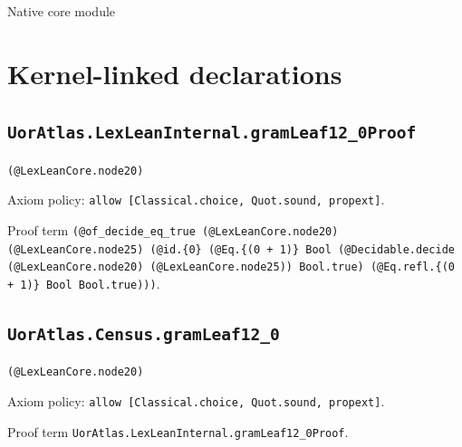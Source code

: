 \documentclass[11pt]{article}
\begin{document}
\begin{center}{\LARGE Native core module}\end{center}
\section*{Kernel-linked declarations}
\subsection*{\texttt{UorAtlas.LexLeanInternal.gramLeaf12\_0Proof}}
\noindent\texttt{(@LexLeanCore.node20)}\par
\noindent Axiom policy: \texttt{allow [Classical.choice, Quot.sound, propext]}.\par
\noindent Proof term \texttt{(@of\_decide\_eq\_true (@LexLeanCore.node20) (@LexLeanCore.node25) (@id.\{0\} (@Eq.\{(0 + 1)\} Bool (@Decidable.decide (@LexLeanCore.node20) (@LexLeanCore.node25)) Bool.true) (@Eq.refl.\{(0 + 1)\} Bool Bool.true)))}.\par
\subsection*{\texttt{UorAtlas.Census.gramLeaf12\_0}}
\noindent\texttt{(@LexLeanCore.node20)}\par
\noindent Axiom policy: \texttt{allow [Classical.choice, Quot.sound, propext]}.\par
\noindent Proof term \texttt{UorAtlas.LexLeanInternal.gramLeaf12\_0Proof}.\par
\end{document}

